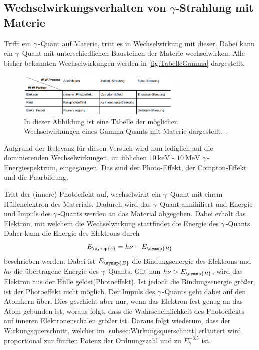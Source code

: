 \subsection{\texorpdfstring{Wechselwirkungsverhalten von $\gamma$-Strahlung mit Materie}{Wechselwirkungsverhalten von Gamma-Strahlung mit Materie}}
\label{Gammawechselwirkung}
Trifft ein $\gamma$\,-Quant auf Materie, tritt es in Wechselwirkung mit dieser. Dabei kann ein $\gamma$\,-Quant mit unterschiedlichen Bausteinen der Materie wechselwirken. 
Alle bisher bekannten Wechselwirkungen werden in \autoref{fig:TabelleGamma} dargestellt.

\begin{figure}
    \centering
    \includegraphics[width = 0.7\textwidth]{content/TabelleGamma.png}
    \caption{In dieser Abbildung ist eine Tabelle der möglichen Wechselwirkungen eines Gamma-Quants mit Materie dargestellt. \cite{v704}.}
    \label{fig:TabelleGamma}
\end{figure}

Aufgrund der Relevanz für diesen Versuch wird nun lediglich auf die dominierenden Wechselwirkungen, im üblichen $\qty{10}{\kilo\electronvolt}$ - $\qty{10}{\mega\electronvolt}$
$\gamma$\,-Energiespektrum, eingegangen. Das sind der Photo-Effekt, der Compton-Effekt und die Paarbildung.


Tritt der (innere) Photoeffekt auf, wechselwirkt ein $\gamma$\,-Quant mit einem Hüllenelektron des Materials. Dadurch wird das $\gamma$\,-Quant annihiliert und Energie und 
Impuls des $\gamma$\,-Quants werden an das Material abgegeben. Dabei erhält das Elektron, mit welchem die Wechselwirkung stattfindet die Energie des $\gamma$\,-Quants.
Daher kann die Energie des Elektrons durch 
\begin{equation*}
    E_{\symup{e}} = h\nu - E_{\symup{B}}
\end{equation*}
beschrieben werden. Dabei ist $E_{\symup{B}}$ die Bindungsenergie des Elektrons und $h\nu$ die übertragene Energie des $\gamma$\,-Quants. Gilt nun $h\nu > E_{\symup{B}}$, wird
das Elektron aus der Hülle gelöst(Photoeffekt). Ist jedoch die Bindungsenergie größer, ist der Photoeffekt nicht möglich.  Der Impuls des $\gamma$\,-Quants geht dabei auf den 
Atomkern über. Dies geschieht aber nur, wenn das Elektron fest genug an das Atom gebunden ist, woraus folgt, dass die Wahrscheinlichkeit des Photoeffekts auf inneren 
Elektronenschalen größer ist. Daraus folgt wiederum, dass der Wirkungsquerschnitt, welcher im \autoref{subsec:Wirkungsquerschnitt} erläutert wird, proportional zur fünften 
Potenz der Ordnungszahl und zu $E_\gamma^{-3.5}$ ist.


